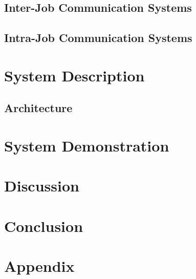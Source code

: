 \documentclass[a4paper,12pt,oldfontcommands]{memoir}
\begin{document}
\section{Inter-Job Communication Systems}

\section{Intra-Job Communication Systems}

\chapter{System Description}

\section{Architecture}

\section{}

\chapter{System Demonstration}

\chapter{Discussion}

\chapter{Conclusion}


%
%

\appendix
\appendixpage

\chapter{Appendix}

\listoftodos
\end{document}
